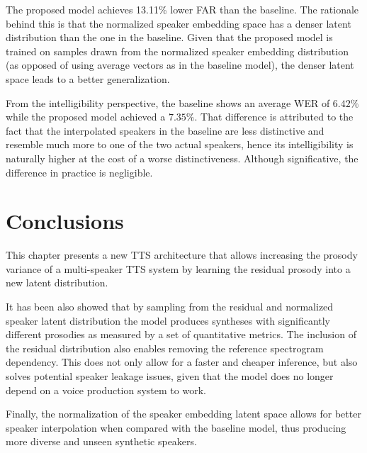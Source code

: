 The proposed model achieves 13.11\% lower FAR than the baseline. The rationale behind this is that the normalized speaker embedding space has a denser latent distribution than the one in the baseline. Given that the proposed model is trained on samples drawn from the normalized speaker embedding distribution (as opposed of using average vectors as in the baseline model), the denser latent space leads to a better generalization.


From the intelligibility perspective, the baseline shows an average WER of $6.42\%$ while the proposed model achieved a $7.35\%$. That difference is attributed to the fact that the interpolated speakers in the baseline are less distinctive and resemble much more to one of the two actual speakers, hence its intelligibility is naturally higher at the cost of a worse distinctiveness. Although significative, the difference in practice is negligible.


\section{Conclusions}


This chapter presents a new TTS architecture that allows increasing the prosody variance of a multi-speaker TTS system by learning the residual prosody into a new latent distribution. 

It has been also showed that by sampling from the residual and normalized speaker latent distribution the model produces syntheses with significantly different prosodies as measured by a set of quantitative metrics. The inclusion of the residual distribution also enables removing the reference spectrogram dependency. This does not only allow for a faster and  cheaper inference, but also solves potential speaker leakage issues, given that the model does no longer depend on a voice production system to work.


Finally, the normalization of the speaker embedding latent space allows for better speaker interpolation when compared with the baseline model, thus producing more diverse and unseen synthetic speakers.


